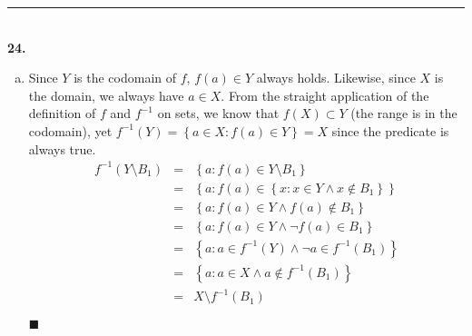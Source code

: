 \documentclass{article}[10pt]
\newenvironment{exercise}[1]
    {\noindent\rule{2cm}{0.4pt} \\
     \textbf{#1.}}
    {}
\newcommand{\qed}{

\hfill\ensuremath{\blacksquare}

}
\begin{document}
\begin{exercise}{24}
\begin{enumerate}[(a)]
    \item
      Since $Y$ is the codomain of $f$, $f(a) \in Y$ always holds.
      Likewise, since $X$ is the domain, we always have $a \in X$.
      From the straight application
      of the definition of $f$ and $f^{-1}$ on sets,
      we know that $f(X) \subset Y$ (the range is in the codomain),
      yet $f^{-1}(Y) = \left\{ a \in X : f(a) \in Y \right\} = X$
      since the predicate is always true.
      \[\begin{array}{rcl}
        f^{-1}(Y \setminus B_1)
        &=& \left\{ a : f(a) \in Y \setminus B_1 \right\} \\
        &=& \left\{ a : f(a) \in \left\{ x : x \in Y \land x \notin B_1
                                 \right\}
            \right\} \\
        &=& \left\{ a : f(a) \in Y \land
                        f(a) \notin B_1 \right\} \\
        &=& \left\{ a : f(a) \in Y \land
                        \lnot f(a) \in B_1 \right\} \\
        &=& \left\{ a : a \in f^{-1}(Y) \land
                        \lnot a \in f^{-1}(B_1) \right\} \\
        &=& \left\{ a : a \in X \land
                        a \notin f^{-1}(B_1) \right\} \\
        &=& X \setminus f^{-1}(B_1)
      \end{array}\]
      \qed
  \end{enumerate}
\end{exercise}
\end{document}
